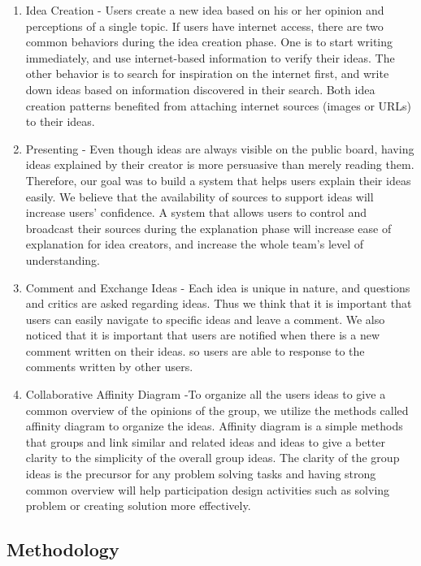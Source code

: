 \documentclass{sigchi}
\begin{document}
\begin{itemize}
\begin{itemize}
\begin{enumerate}
\item Idea Creation - Users create a new idea based on his or her opinion and perceptions of a single topic. If users have internet access, there are two common behaviors during the idea creation phase. One is to start writing immediately, and use internet-based information to verify their ideas. The other behavior is to search for inspiration on the internet first, and write down ideas based on information discovered in their search. Both idea creation patterns benefited from attaching internet sources (images or URLs) to their ideas. 
\item Presenting - Even though ideas are always visible on the public board, having ideas explained by their creator is more persuasive than merely reading them. Therefore, our goal was to build a system that helps users explain their ideas easily. We believe that the availability of sources to support ideas will increase users' confidence. A system that allows users to control and broadcast their sources during the explanation phase will increase ease of explanation for idea creators, and increase the whole team's level of understanding.
\item Comment and Exchange Ideas - Each idea is unique in nature, and questions and critics are asked regarding ideas. Thus we think that it is important that users can easily navigate to specific ideas and leave a comment. We also noticed that it is important that users are notified when there is a new comment written on their ideas. so users are able to response to the comments written by other users. 
\item Collaborative Affinity Diagram -To organize all the users ideas to give a common overview of the opinions of the group, we utilize the methods called affinity diagram to organize the ideas. Affinity diagram is a simple methods that groups and link similar and related ideas and ideas to give a better clarity to the simplicity of the overall group ideas. The clarity of the group ideas is the precursor for any problem solving tasks and having strong common overview will help participation design activities such as solving problem or creating solution more effectively. 
\end{enumerate}

\subsection{Methodology}


\end{itemize}
\end{itemize}
\end{document}
